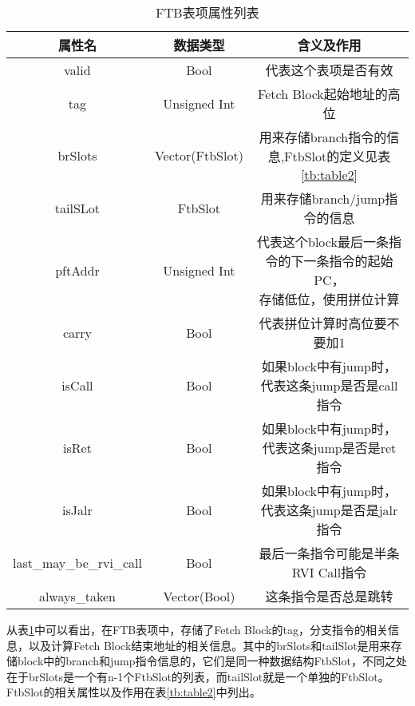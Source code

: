 \begin{table}[]
	\caption{FTB表项属性列表}
	\label{tb:table1}
	\centering
    \begin{tabular}{ccc}
        \toprule
        属性名 & 数据类型 & 含义及作用 \\
        \midrule
        valid & Bool & 代表这个表项是否有效 \\
		tag & Unsigned Int & Fetch Block起始地址的高位 \\
		brSlots & Vector(FtbSlot) & 用来存储branch指令的信息,FtbSlot的定义见表\ref{tb:table2} \\
		tailSLot & FtbSlot & 用来存储branch/jump指令的信息 \\
		pftAddr & Unsigned Int & \tabincell{c}{代表这个block最后一条指令的下一条指令的起始PC， \\ 存储低位，使用拼位计算} \\
		carry & Bool & 代表拼位计算时高位要不要加1 \\
		isCall & Bool & 如果block中有jump时，代表这条jump是否是call指令 \\
		isRet & Bool & 如果block中有jump时，代表这条jump是否是ret指令 \\
		isJalr & Bool & 如果block中有jump时，代表这条jump是否是jalr指令 \\
		last\_may\_be\_rvi\_call & Bool & 最后一条指令可能是半条RVI Call指令 \\
		always\_taken & Vector(Bool) & 这条指令是否总是跳转 \\
        \bottomrule
    \end{tabular}
\end{table}

从表\ref{tb:table1}中可以看出，在FTB表项中，存储了Fetch Block的tag，分支指令的相关信息，以及计算Fetch Block结束地址的相关信息。其中的brSlots和tailSlot是用来存储block中的branch和jump指令信息的，它们是同一种数据结构FtbSlot，不同之处在于brSlots是一个有n-1个FtbSlot的列表，而tailSlot就是一个单独的FtbSlot。FtbSlot的相关属性以及作用在表\ref{tb:table2}中列出。


